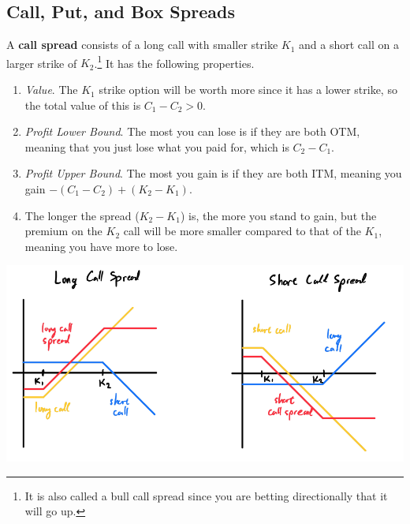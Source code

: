 \documentclass{article}
\begin{document}
  \subsection{Call, Put, and Box Spreads}

    \begin{definition}
      A \textbf{call spread} consists of a long call with smaller strike $K_1$ and a short call on a larger strike of $K_2$.\footnote{It is also called a bull call spread since you are betting directionally that it will go up.} It has the following properties. 
      \begin{enumerate}
        \item \textit{Value}. The $K_1$ strike option will be worth more since it has a lower strike, so the total value of this is $C_1 - C_2 > 0$. 
        \item \textit{Profit Lower Bound}. The most you can lose is if they are both OTM, meaning that you just lose what you paid for, which is $C_2 - C_1$. 
        \item \textit{Profit Upper Bound}. The most you gain is if they are both ITM, meaning you gain $-(C_1 - C_2) + (K_2 - K_1)$. 
        \item The longer the spread ($K_2 - K_1$) is, the more you stand to gain, but the premium on the $K_2$ call will be more smaller compared to that of the $K_1$, meaning you have more to lose. 
      \end{enumerate}
      \begin{center}
        \includegraphics[scale=0.3]{img/call_spread.png}
      \end{center}
    \end{definition}
\end{document}
